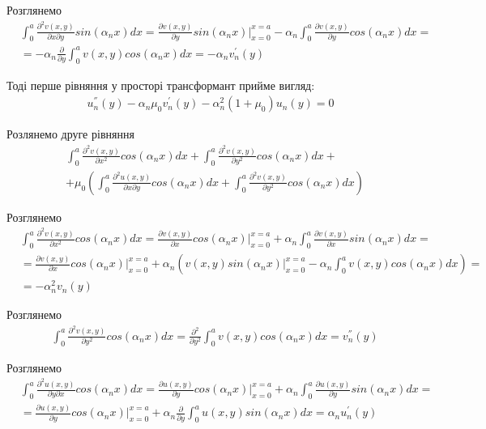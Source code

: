 \documentclass[a4paper,14pt]{extarticle}
\numberwithin{equation}{section}
\begin{document}
Розглянемо
\begin{align*}
    &\int_{0}^{a} \frac{\partial^2 v(x,y)}{\partial x \partial y} sin(\alpha_n x) dx = \frac{\partial v(x,y)}{\partial y} sin(\alpha_n x) |_{x=0}^{x=a} - \alpha_n \int_{0}^{a} \frac{\partial v(x,y)}{\partial y} cos(\alpha_n x) dx = \\
    &= -\alpha_n \frac{\partial}{\partial y} \int_{0}^{a} v(x,y) cos(\alpha_n x) dx = -\alpha_n v_n^{'}(y)
\end{align*}

Тоді перше рівняння у просторі трансформант прийме вигляд:
\begin{align*}
    u_n^{''}(y) - \alpha_n \mu_0 v_n^{'}(y) - \alpha_n^2 (1 + \mu_0) u_n(y) = 0
\end{align*}

Розлянемо друге рівняння
\begin{align*}
    &\int_{0}^{a} \frac{\partial^2 v(x,y)}{\partial x^2} cos(\alpha_n x)dx + \int_{0}^{a} \frac{\partial^2 v(x,y)}{\partial y^2} cos(\alpha_n x)dx + \\ 
    & + \mu_0 \left( \int_{0}^{a} \frac{\partial^2 u(x,y)}{\partial x \partial y} cos(\alpha_n x)dx +  \int_{0}^{a} \frac{\partial^2 v(x,y)}{\partial y^2} cos(\alpha_n x) dx\right)
\end{align*}

Розглянемо
\begin{align*}
    &\int_{0}^{a} \frac{\partial^2 v(x,y)}{\partial x^2} cos(\alpha_n x)dx = \frac{\partial v(x,y)}{\partial x} cos(\alpha_n x) |_{x=0}^{x=a} + \alpha_n \int_{0}^{a} \frac{\partial v(x,y)}{\partial x} sin(\alpha_n x) dx = \\
    &=\frac{\partial v(x,y)}{\partial x} cos(\alpha_n x) |_{x=0}^{x=a} + \alpha_n \left(v(x,y) sin(\alpha_n x)|_{x=0}^{x=a} - \alpha_n \int_{0}^{a} v(x,y) cos(\alpha_n x) dx  \right) = \\
    &= -\alpha_n^2 v_n(y)
\end{align*}

Розглянемо
\begin{align*}
    &\int_{0}^{a} \frac{\partial^2 v(x,y)}{\partial y^2} cos(\alpha_n x)dx = \frac{\partial^2}{\partial y^2} \int_{0}^{a} v(x,y) cos(\alpha_n x)dx = v_n^{''}(y)
\end{align*}

Розглянемо
\begin{align*}
    &\int_{0}^{a} \frac{\partial^2 u(x,y)}{\partial y \partial x} cos(\alpha_n x)dx = \frac{\partial u(x,y)}{\partial y} cos(\alpha_n x) |_{x=0}^{x=a} + \alpha_n \int_{0}^{a} \frac{\partial u(x,y)}{\partial y} sin(\alpha_n x) dx = \\
    &=\frac{\partial u(x,y)}{\partial y} cos(\alpha_n x) |_{x=0}^{x=a} + \alpha_n \frac{\partial}{\partial y} \int_{0}^{a} u(x,y) sin(\alpha_n x) dx = \alpha_n u_n^{'}(y)\\
\end{align*}
\end{document}
